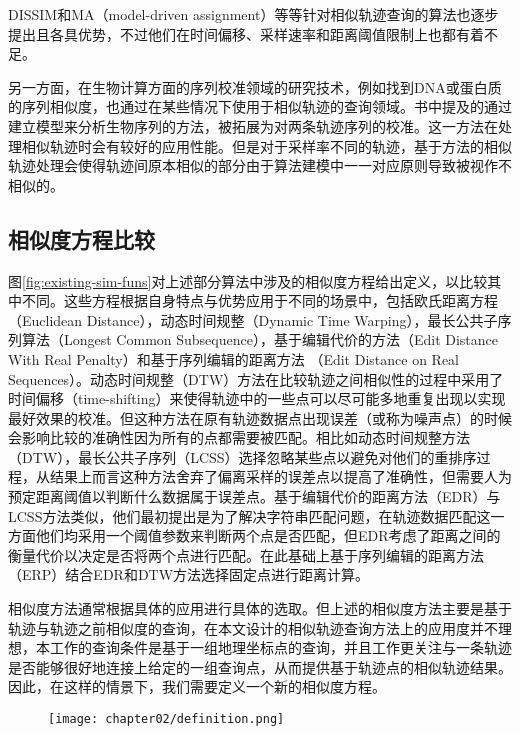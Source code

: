 DISSIM\cite{frentzos2007index}和MA（model-driven assignment）\cite{sankararaman2013model}等等针对相似轨迹查询的算法也逐步提出且各具优势，不过他们在时间偏移、采样速率和距离阈值限制上也都有着不足。

另一方面，在生物计算方面的序列校准领域的研究技术，例如找到DNA或蛋白质的序列相似度，也通过在某些情况下使用于相似轨迹的查询领域。书\cite{durbin1998biological}中提及的通过建立模型来分析生物序列的方法，被拓展为对两条轨迹序列的校准。这一方法在处理相似轨迹时会有较好的应用性能。但是对于采样率不同的轨迹，基于方法\cite{durbin1998biological}的相似轨迹处理会使得轨迹间原本相似的部分由于算法建模中一一对应原则导致被视作不相似的。


\subsection{相似度方程比较}
\label{subsec:situation-sim-fun-compare}


图\ref{fig:existing-sim-funs}对上述部分算法中涉及的相似度方程给出定义，以比较其中不同。这些方程根据自身特点与优势应用于不同的场景中\cite{morse2007efficient}，包括欧氏距离方程（Euclidean Distance），动态时间规整（Dynamic Time Warping），最长公共子序列算法（Longest Common Subsequence），基于编辑代价的方法（Edit Distance With Real Penalty）和基于序列编辑的距离方法 （Edit Distance on Real Sequences）。动态时间规整（DTW）方法在比较轨迹之间相似性的过程中采用了时间偏移（time-shifting）来使得轨迹中的一些点可以尽可能多地重复出现以实现最好效果的校准。但这种方法在原有轨迹数据点出现误差（或称为噪声点）的时候会影响比较的准确性因为所有的点都需要被匹配。相比如动态时间规整方法（DTW），最长公共子序列（LCSS）选择忽略某些点以避免对他们的重排序过程，从结果上而言这种方法舍弃了偏离采样的误差点以提高了准确性，但需要人为预定距离阈值以判断什么数据属于误差点。基于编辑代价的距离方法（EDR）与LCSS方法类似，他们最初提出是为了解决字符串匹配问题，在轨迹数据匹配这一方面他们均采用一个阈值参数来判断两个点是否匹配，但EDR考虑了距离之间的衡量代价以决定是否将两个点进行匹配。在此基础上基于序列编辑的距离方法（ERP）结合EDR和DTW方法选择固定点进行距离计算。

相似度方法通常根据具体的应用进行具体的选取。但上述的相似度方法主要是基于轨迹与轨迹之前相似度的查询，在本文设计的相似轨迹查询方法上的应用度并不理想，本工作的查询条件是基于一组地理坐标点的查询，并且工作更关注与一条轨迹是否能够很好地连接上给定的一组查询点，从而提供基于轨迹点的相似轨迹结果。因此，在这样的情景下，我们需要定义一个新的相似度方程。

\begin{figure}[!htp]
  \centering
  \texttt{[image: chapter02/definition.png]}
\end{figure}

